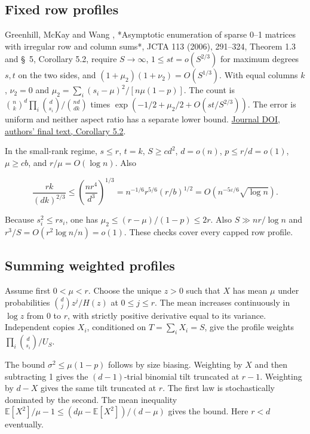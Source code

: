\documentclass[11pt]{article}
\begin{document}
\subsection{Fixed row profiles}

Greenhill, McKay and Wang \cite{GMW}, *Asymptotic enumeration of sparse 0--1 matrices with irregular row and column sums*, JCTA 113 (2006), 291--324, Theorem 1.3 and \S~5, Corollary 5.2, require $S\to\infty$, $1\le st=o(S^{2/3})$ for maximum degrees $s,t$ on the two sides, and $(1+\mu_2)(1+\nu_2)=O(S^{1/3})$. With equal columns $k$, $\nu_2=0$ and $\mu_2=\sum_i(s_i-\mu)^2/[n\mu(1-p)]$. The count is $\binom nk^d\prod_i\binom d{s_i}/\binom{nd}{dk}$ times $\exp(-1/2+\mu_2/2+O(st/S^{2/3}))$. The error is uniform and neither aspect ratio has a separate lower bound. \href{https://doi.org/10.1016/j.jcta.2005.03.005}{Journal DOI}, \href{https://web.maths.unsw.edu.au/~csg/papers/irregular-final.pdf\#page=33}{authors' final text, Corollary 5.2}.

In the small-rank regime, $s\le r$, $t=k$, $S\ge cd^2$, $d=o(n)$, $p\le r/d=o(1)$, $\mu\ge cb$, and $r/\mu=O(\log n)$. Also

\[
\frac{rk}{(dk)^{2/3}}\le \left(\frac{nr^4}{d^3}\right)^{1/3}
=n^{-1/6}r^{5/6}(r/b)^{1/2}
=O(n^{-5\varepsilon/6}\sqrt{\log n}).
\]

Because $s_i^2\le r s_i$, one has $\mu_2\le(r-\mu)/(1-p)\le2r$. Also $S\gg nr/\log n$ and $r^3/S=O(r^2\log n/n)=o(1)$. These checks cover every capped row profile.

\subsection{Summing weighted profiles}

Assume first $0<\mu<r$. Choose the unique $z>0$ such that $X$ has mean $\mu$ under probabilities $\binom dj z^j/H(z)$ at $0\le j\le r$. The mean increases continuously in $\log z$ from 0 to $r$, with strictly positive derivative equal to its variance. Independent copies $X_i$, conditioned on $T=\sum_iX_i=S$, give the profile weights $\prod_i\binom d{s_i}/U_S$.

The bound $\sigma^2\le\mu(1-p)$ follows by size biasing. Weighting by $X$ and then subtracting 1 gives the $(d-1)$-trial binomial tilt truncated at $r-1$. Weighting by $d-X$ gives the same tilt truncated at $r$. The first law is stochastically dominated by the second. The mean inequality $\mathbb E[X^2]/\mu-1\le(d\mu-\mathbb E[X^2])/(d-\mu)$ gives the bound. Here $r<d$ eventually.
\end{document}
